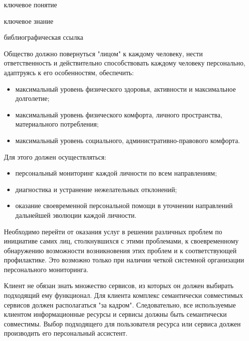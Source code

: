\begin{SCn}

\bigskip

\begin{scnrelfromlist}{ключевое понятие}
\end{scnrelfromlist}

\bigskip

\begin{scnrelfromlist}{ключевое знание}
\end{scnrelfromlist}

\bigskip

\begin{scnrelfromlist}{библиографическая ссылка}
\end{scnrelfromlist}

\end{SCn}

Общество должно повернуться "лицом"{} к каждому человеку, нести ответственность и действительно способствовать каждому человеку персонально, адаптруясь к его особенностям, обеспечить:
\begin{itemize}
    \item максимальный уровень физического здоровья, активности и максимальное долголетие;
    \item максимальный уровень физического комфорта, личного пространства, материального потребления;
    \item максимальный уровень социального, административно-правового комфорта.
\end{itemize}

Для этого должен осуществляться:
\begin{itemize}
    \item персональный мониторинг каждой личности по всем направлениям;
    \item диагностика и устранение нежелательных отклонений;
    \item оказание своевременной персональной помощи в уточнении направлений дальнейшей эволюции каждой личности.
\end{itemize}

Необходимо перейти от оказания услуг в решении различных проблем по инициативе самих лиц, столкнувшихся с этими проблемами, к своевременному обнаружению возможности возникновения этих проблем и к соответствующей профилактике. 
Это возможно только при наличии четкой системной организации персонального мониторинга. 

Клиент не обязан знать множество сервисов, из которых он должен выбирать подходящий ему функционал. 
Для клиента комплекс семантически совместимых сервисов должен располагаться "за кадром"{}. 
Следовательно, все используемые клиентом информационные ресурсы и сервисы должны быть семантически совместимы. 
Выбор подходящего для пользователя ресурса или сервиса должен производить его персональный ассистент.

